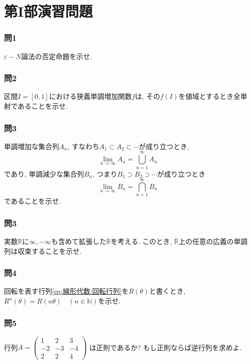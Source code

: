     \section{第I部演習問題}
        \subsubsection*{問1} $\varepsilon-N$論法の否定命題を示せ.

        \subsubsection*{問2} 区間$I=[0,1]$における狭義単調増加関数$f$は, その$f(I)$を値域とするとき全単射であることを示せ. 

        \subsubsection*{問3} 単調増加な集合列$A_n$, すなわち$A_1\subset A_2\subset\cdots$が成り立つとき, 
            \begin{equation}
                \lim_{n\to\infty} A_n = \bigcup_{n=1}^\infty A_n
            \end{equation}
            であり, 単調減少な集合列$B_n$, つまり$B_1\supset B_2 \supset \cdots$が成り立つとき
            \begin{equation}
                \lim_{n\to\infty} B_n = \bigcap_{n=1}^\infty B_n
            \end{equation}
            であることを示せ.
        
        \subsubsection*{問3} 実数$\mathbb{R}$に$\infty,-\infty$も含めて拡張した$\overline{\mathbb{R}}$を考える. このとき, $\overline{\mathbb{R}}$上の任意の広義の単調列は収束することを示せ.

        \subsubsection*{問4} 回転を表す行列\eqref{eq:線形代数:回転行列}を$R(\theta)$と書くとき, $R^n(\theta)=R(n\theta)\quad (n\in\mathbb{N})$を示せ.

        \subsubsection*{問5} 行列$\displaystyle A=\begin{pmatrix}1&2&3\\-2&-3&-4\\2&2&4\end{pmatrix}$ は正則であるか? もし正則ならば逆行列を求めよ.

